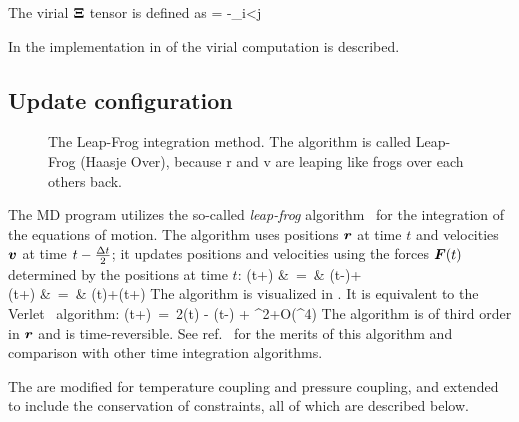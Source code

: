 The virial ${\bf \Xi}$ tensor is defined as 
\beq
{\bf \Xi} = -\half \sum_{i<j} \rvij \otimes \Fvij 
\eeq

In  the
implementation  in {\gromacs} of the virial computation is described.

\subsection{Update configuration}
\label{subsec:update}
\begin{figure}
\centerline{}
\caption[The Leap-Frog integration method.]{The Leap-Frog integration method. The algorithm is called
Leap-Frog  (Haasje Over), because r and v are leaping
like  frogs over each others back.}
\label{fig:leapfrog}
\end{figure}

The {\gromacs} MD program utilizes the so-called {\em leap-frog} 
algorithm~\cite{Hockney74} for the integration of the equations of
motion.  The  
algorithm uses positions $\mbox{\boldmath ${r}$}$ at time $t$ and
velocities $\mbox{\boldmath ${v}$}$ at time $t-{\frac {\Delta t}{2}}$; it updates positions and
velocities using the forces
$\mbox{\boldmath ${F}$}(t)$ determined by the positions at time $t$: 
\bea
{}(t+\hDt)  &~=~&   (t-\hDt)+\Dt   \\
(t+\Dt)   &~=~&   (t)+(t+\hDt)\Dt
\eea
The algorithm is visualized in .
It is equivalent to the Verlet~\cite{Verlet67} algorithm:
\beq
{}(t+\Dt)~=~2(t) - (t-\Dt) + \Dt^2+O(\Dt^4)
\eeq
The algorithm is of third order in $\mbox{\boldmath ${r}$}$ and is time-reversible.
See ref.~\cite{Berendsen86b} for the merits of this algorithm and comparison
with other time integration algorithms.
 
The  are modified for temperature coupling
 and pressure coupling, and extended to include the conservation of
constraints, all of which are described below.

